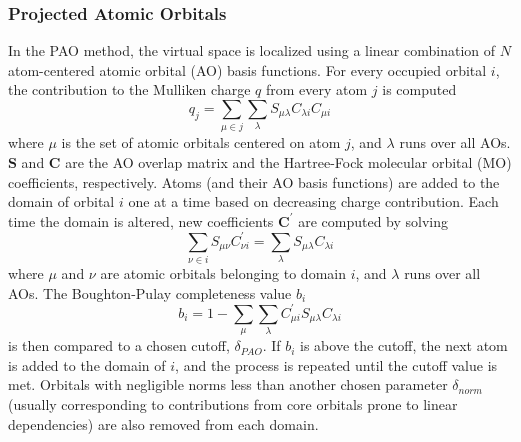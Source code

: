 \subsubsection{Projected Atomic Orbitals} \label{sss:pao}
In the PAO method, the virtual space is localized using a linear combination of $N$ atom-centered 
atomic orbital (AO) basis functions. For every occupied orbital $i$, the contribution to the 
Mulliken charge $q$ from every atom $j$ is computed
\begin{equation}
    q_j = \sum_{\mu\in j}\sum_\lambda S_{\mu\lambda}C_{\lambda i}C_{\mu i}
\end{equation}
where $\mu$ is the set of atomic orbitals centered on atom $j$, and $\lambda$ runs over all AOs.
$\textbf{S}$ and $\textbf{C}$ are the AO overlap matrix and 
the Hartree-Fock molecular orbital (MO) coefficients, respectively.
Atoms (and their AO basis functions) are 
added to the domain of orbital $i$ one at a time based on decreasing charge contribution. 
Each time the domain is altered, new coefficients $\textbf{C}^{\prime}$ are computed by solving
\begin{equation}
    \sum_{\nu\in i}S_{\mu\nu}C^{\prime}_{\nu i} = \sum_{\lambda}S_{\mu\lambda}C_{\lambda i}
\end{equation}
where $\mu$ and $\nu$ are atomic orbitals belonging to domain ${i}$, and $\lambda$
runs over all AOs.
The Boughton-Pulay completeness value $b_i$ 
\begin{equation}
    b_i = 1 - \sum_{\mu}\sum_{\lambda}C^{\prime}_{\mu i}S_{\mu\lambda}C_{\lambda i}
\end{equation}
is then compared to a chosen cutoff, $\delta_{PAO}$. If $b_i$ is above the cutoff, the 
next atom is added to the domain of $i$, and the process is repeated until the cutoff value
is met. Orbitals with negligible norms less than another chosen parameter $\delta_{norm}$
(usually corresponding to contributions from core orbitals prone to linear dependencies)
are also removed from each domain.


